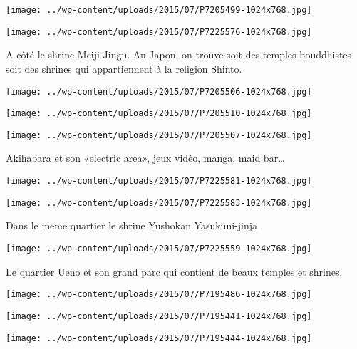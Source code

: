  \newline
\centerline{\texttt{[image: ../wp-content/uploads/2015/07/P7205499-1024x768.jpg]} } 
 \newline
 \newline
\centerline{\texttt{[image: ../wp-content/uploads/2015/07/P7225576-1024x768.jpg]} } 
 \newline
 A côté le shrine Meiji Jingu. Au Japon, on trouve soit des temples bouddhistes soit des shrines qui appartiennent à la religion Shinto. \newline
 \newline
\centerline{\texttt{[image: ../wp-content/uploads/2015/07/P7205506-1024x768.jpg]} } 
 \newline
 \newline
\centerline{\texttt{[image: ../wp-content/uploads/2015/07/P7205510-1024x768.jpg]} } 
 \newline
 \newline
\centerline{\texttt{[image: ../wp-content/uploads/2015/07/P7205507-1024x768.jpg]} } 
 \newline
 Akihabara et son «electric area», jeux vidéo, manga, maid bar… \newline
 \newline
\centerline{\texttt{[image: ../wp-content/uploads/2015/07/P7225581-1024x768.jpg]} } 
 \newline
 \newline
\centerline{\texttt{[image: ../wp-content/uploads/2015/07/P7225583-1024x768.jpg]} } 
 \newline
 Dans le meme quartier le shrine Yushokan Yasukuni-jinja \newline
 \newline
\centerline{\texttt{[image: ../wp-content/uploads/2015/07/P7225559-1024x768.jpg]} } 
 \newline
 Le quartier Ueno et son grand parc qui contient de beaux temples et shrines. \newline
 \newline
\centerline{\texttt{[image: ../wp-content/uploads/2015/07/P7195486-1024x768.jpg]} } 
 \newline
 \newline
\centerline{\texttt{[image: ../wp-content/uploads/2015/07/P7195441-1024x768.jpg]} } 
 \newline
 \newline
\centerline{\texttt{[image: ../wp-content/uploads/2015/07/P7195444-1024x768.jpg]} } 
